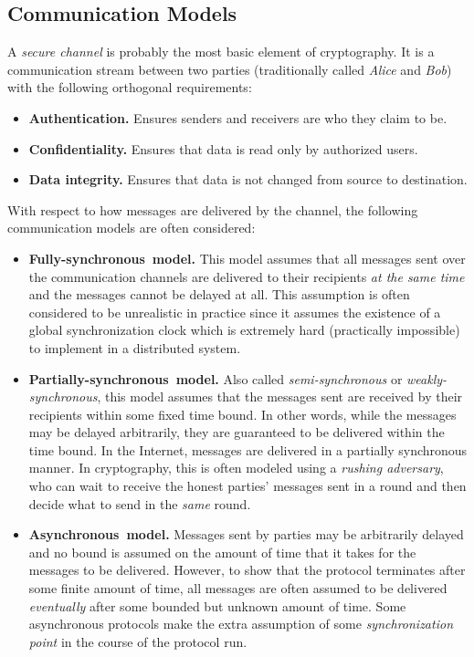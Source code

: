 \documentclass[10pt]{article}
\theoremstyle{plain}
\begin{document}
\subsection{Communication Models}

A \emph{secure channel} is probably the most basic element of cryptography.
It is a communication stream between two parties (traditionally called
\emph{Alice} and\emph{ Bob}) with the following orthogonal requirements:
\begin{itemize}
	\item \textbf{Authentication.} Ensures senders and receivers are who they
	claim to be.
	\item \textbf{Confidentiality.} Ensures that data is read only by authorized
	users.
	\item \textbf{Data integrity.} Ensures that data is not changed from source
	to destination.
\end{itemize}
With respect to how messages are delivered by the channel, the following
communication models are often considered:
\begin{itemize}
	\item \textbf{Fully-synchronous~model. }This model assumes that all messages
	sent over the communication channels are delivered to their recipients
	\emph{at the same time} and the messages cannot be delayed at all.
	This assumption is often considered to be unrealistic in practice
	since it assumes the existence of a global synchronization clock which
	is extremely hard (practically impossible) to implement in a distributed
	system.
	\item \textbf{Partially-synchronous~model. }Also called \emph{semi-synchronous}
	or \emph{weakly-synchronous}, this model assumes that the messages
	sent are received by their recipients within some fixed time bound.
	In other words, while the messages may be delayed arbitrarily, they
	are guaranteed to be delivered within the time bound. In the Internet,
	messages are delivered in a partially synchronous manner. In cryptography,
	this is often modeled using a \emph{rushing adversary}, who can wait
	to receive the honest parties' messages sent in a round and then decide
	what to send in the \emph{same }round.
	\item \textbf{Asynchronous~model. }Messages sent by parties may be arbitrarily
	delayed and no bound is assumed on the amount of time that it takes
	for the messages to be delivered. However, to show that the protocol
	terminates after some finite amount of time, all messages are often
	assumed to be delivered \emph{eventually }after some bounded but unknown
	amount of time.\textbf{ }Some asynchronous protocols make the extra
	assumption of some \emph{synchronization point} in the course of the
	protocol run.
\end{itemize}
\end{document}
